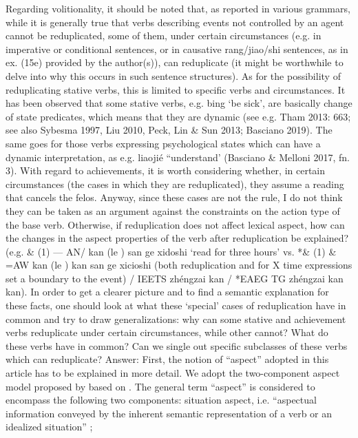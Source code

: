 \documentclass[fleqn,twoside]{article}
\begin{document}
Regarding volitionality, it should be noted that, as reported in various grammars, while it is generally true that verbs describing events not controlled by an agent cannot be reduplicated, some of them, under certain circumstances (e.g. in imperative or conditional sentences, or in causative rang/jiao/shi sentences, as in ex. (15e) provided by the author(s)), can reduplicate (it might be worthwhile to delve into why this occurs in such sentence structures). As for the possibility of reduplicating stative verbs, this is limited to specific verbs and circumstances. It has been observed that some stative verbs, e.g. bing ‘be sick’, are basically change of state predicates, which means that they are dynamic (see e.g. Tham 2013: 663; see also Sybesma 1997, Liu 2010, Peck, Lin \& Sun 2013; Basciano 2019). The same goes for those verbs expressing psychological states which can have a dynamic interpretation, as e.g. liaojié “understand’ (Basciano \& Melloni 2017, fn. 3). With regard to achievements, it is worth considering whether, in certain circumstances (the cases in which they are reduplicated), they assume a reading that cancels the felos. Anyway, since these cases are not the rule, I do not think they can be taken as an argument against the constraints on the action type of the base verb. Otherwise, if reduplication does not affect lexical aspect, how can the changes in the aspect properties of the verb after reduplication be explained? (e.g. \& (1) — AN/ kan (le ) san ge xidoshi ‘read for three hours’ vs. *\& (1) \& =AW kan (le ) kan san ge xicioshi (both reduplication and for X time expressions set a boundary to the event) / IE{ETS zhéngzai kan / *EAEG TG zhéngzai kan kan). In order to get a clearer picture and to find a semantic explanation for these facts, one should look at what these ‘special’ cases of reduplication have in common and try to draw generalizations: why can some stative and achievement verbs reduplicate under certain circumstances, while other cannot? What do these verbs have in common? Can we single out specific subclasses of these verbs which can reduplicate? 
Answer:
First, the notion of ``aspect'' adopted in this article has to be explained in more detail.
We adopt the two-component aspect model proposed by \citet{XiaoMcEnery2004} based on \citet{Smith1991}.
The general term ``aspect'' is considered to encompass the following two components:
situation aspect, i.e. ``aspectual information conveyed by the inherent semantic representation of a verb or an idealized situation'' \citep[21]{XiaoMcEnery2004};
}
\end{document}
